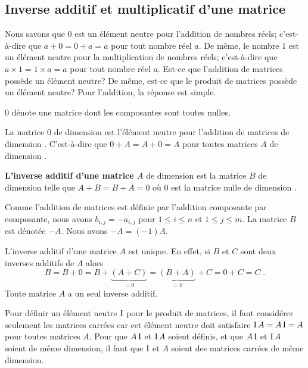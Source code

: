 {\subsection{Inverse additif et multiplicatif d'une matrice}

Nous savons que $0$ est un élément neutre pour l'addition de nombres
réels; c'est-à-dire que $a+0 = 0+a = a$ pour tout nombre réel $a$. De
même, le nombre $1$ est un élément neutre pour la multiplication de
nombres réels; c'est-à-dire que $a \times 1 = 1 \times a = a$ pour
tout nombre réel $a$. Est-ce que l'addition de matrices possède un
élément neutre?  De même, est-ce que le produit de matrices possède un
élément neutre?  Pour l'addition, la réponse est simple.

\begin{focus}{\dfn}
$0$ dénote une matrice dont les composantes sont toutes nulles.
\end{focus}

\begin{focus}{\prp}
La matrice $0$ de dimension  est l'élément neutre pour
l'addition de matrices de dimension .  C'est-à-dire que
$0 + A = A + 0 = A$ pour toutes matrices $A$ de dimension .
\end{focus}

\begin{focus}{\dfn} 
{\bfseries L'inverse additif d'une matrice $A$} de dimension 
est la matrice $B$ de dimension  telle que $A+B=B+A = 0$ où
$0$ est la matrice nulle de dimension .

Comme l'addition de matrices est définie par l'addition composante par
composante, nous avons $b_{i,j} = -a_{i,j}$ pour $1\leq i \leq n$ et
$1 \leq j \leq m$.  La matrice $B$ est dénotée $-A$.
Nous avons $-A = (-1) A$.
\end{focus}

L'inverse additif d'une matrice $A$ est unique.  En effet, si $B$ et
$C$ sont deux inverses additifs de $A$ alors
\[
B = B + 0 = B + \underbrace{(A + C)}_{=0}
= \underbrace{(B+A)}_{=0} + C = 0 + C = C \; .
\]
Toute matrice $A$ a un seul inverse additif.

Pour définir un élément neutre $\operatorname{I}$ pour le produit de matrices, il
faut considérer seulement les matrices carrées car cet élément neutre
doit satisfaire $\operatorname{I} A = A \operatorname{I} = A$ pour toutes matrices $A$.  Pour
que $A \operatorname{I}$ et $\operatorname{I} A$ soient définis, et que $A \operatorname{I}$ et $\operatorname{I} A$
soient de même dimension, il faut que $\operatorname{I}$ et $A$ soient des matrices
carrées de même dimension.

}
